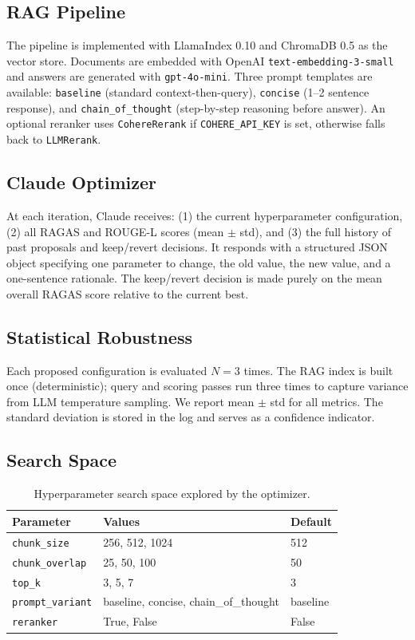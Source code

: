 \documentclass[11pt,a4paper]{article}
\begin{document}
\subsection{RAG Pipeline}

The pipeline is implemented with LlamaIndex 0.10 and ChromaDB 0.5 as the
vector store. Documents are embedded with OpenAI \texttt{text-embedding-3-small}
and answers are generated with \texttt{gpt-4o-mini}. Three prompt templates
are available: \texttt{baseline} (standard context-then-query),
\texttt{concise} (1--2 sentence response), and \texttt{chain\_of\_thought}
(step-by-step reasoning before answer). An optional reranker uses
\texttt{CohereRerank} if \texttt{COHERE\_API\_KEY} is set, otherwise falls
back to \texttt{LLMRerank}.

\subsection{Claude Optimizer}

At each iteration, Claude receives: (1) the current hyperparameter
configuration, (2) all RAGAS and ROUGE-L scores (mean $\pm$ std), and (3)
the full history of past proposals and keep/revert decisions. It responds with
a structured JSON object specifying one parameter to change, the old value,
the new value, and a one-sentence rationale. The keep/revert decision is made
purely on the mean overall RAGAS score relative to the current best.

\subsection{Statistical Robustness}

Each proposed configuration is evaluated $N=3$ times. The RAG index is built
once (deterministic); query and scoring passes run three times to capture
variance from LLM temperature sampling. We report mean $\pm$ std for all
metrics. The standard deviation is stored in the log and serves as a
confidence indicator.

\subsection{Search Space}

\begin{table}[ht]
\centering
\caption{Hyperparameter search space explored by the optimizer.}
\label{tab:search_space}
\begin{tabular}{lll}
\toprule
\textbf{Parameter} & \textbf{Values} & \textbf{Default} \\
\midrule
\texttt{chunk\_size}     & 256, 512, 1024 & 512 \\
\texttt{chunk\_overlap}  & 25, 50, 100    & 50  \\
\texttt{top\_k}          & 3, 5, 7        & 3   \\
\texttt{prompt\_variant} & baseline, concise, chain\_of\_thought & baseline \\
\texttt{reranker}        & True, False    & False \\
\bottomrule
\end{tabular}
\end{table}
\end{document}
